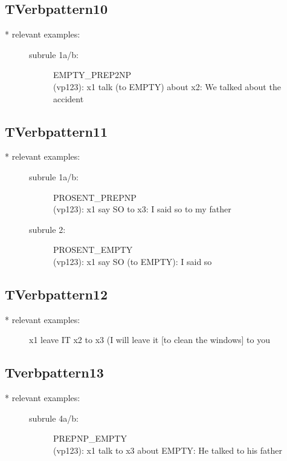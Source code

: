 \subsection{TVerbpattern10}
\begin{description}
\item[* relevant examples:] \mbox{}
\begin{description}
 \item[subrule 1a/b:] EMPTY\_PREP2NP\\
  (vp123): x1 talk (to EMPTY) about x2: We talked about the accident\\
\end{description}
\end{description}

\subsection{TVerbpattern11}
\begin{description}
\item[* relevant examples:] \mbox{}
\begin{description}
\item[subrule 1a/b:]PROSENT\_PREPNP\\
(vp123): x1 say SO to x3: I said so to my father
\item[subrule 2:]PROSENT\_EMPTY\\
(vp123): x1 say SO (to EMPTY): I said so
\end{description}
\end{description}

\subsection{TVerbpattern12}
\begin{description}
\item[* relevant examples:] x1 leave IT x2 to x3 (I will leave it [to clean the 
windows] to you\\
\end{description}

\subsection{Tverbpattern13}
\begin{description}
\item[* relevant examples:] \mbox{}
\begin{description}
\item[subrule 4a/b:] PREPNP\_EMPTY\\
  (vp123): x1 talk to x3 about EMPTY: He talked to his father\\
\end{description}
\end{description}

